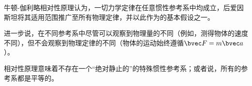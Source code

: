 
\begin{issues}
\issueDraft
\end{issues}


牛顿-伽利略相对性原理认为，一切力学定律在任意惯性参考系中均成立，后爱因斯坦将其适用范围推广至所有物理定律，并以此作为的基本假设之一。

进一步说，在不同参考系中尽管可以观察到物理量的不同（例如，测得物体的速度不同），但不会观察到物理定律的不同（物体的运动始终遵循$\bvec F=m \bvec a$）。

相对性原理意味着不存在一个“绝对静止的”的特殊惯性参考系；或者说，所有的参考系都是平等的。
